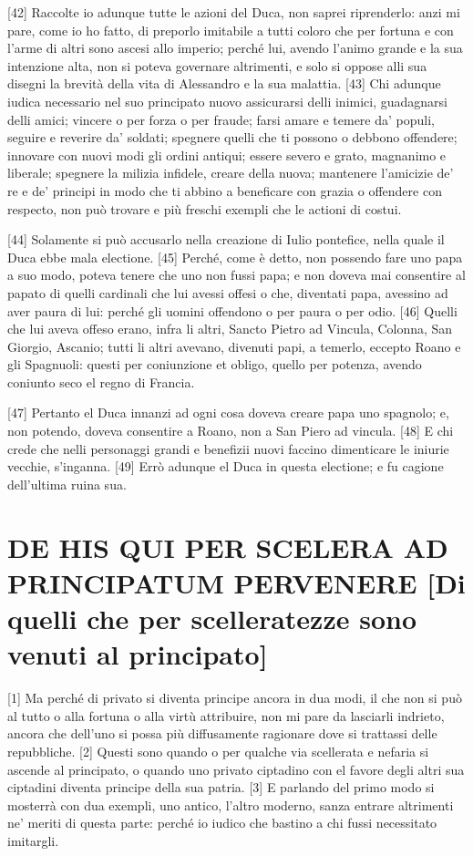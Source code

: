 {[}42{]} Raccolte io adunque tutte le azioni del Duca, non saprei
riprenderlo: anzi mi pare, come io ho fatto, di preporlo imitabile a
tutti coloro che per fortuna e con l'arme di altri sono ascesi allo
imperio; perché lui, avendo l'animo grande e la sua intenzione alta, non
si poteva governare altrimenti, e solo si oppose alli sua disegni la
brevità della vita di Alessandro e la sua malattia. {[}43{]} Chi adunque
iudica necessario nel suo principato nuovo assicurarsi delli inimici,
guadagnarsi delli amici; vincere o per forza o per fraude; farsi amare e
temere da' populi, seguire e reverire da' soldati; spegnere quelli che
ti possono o debbono offendere; innovare con nuovi modi gli ordini
antiqui; essere severo e grato, magnanimo e liberale; spegnere la
milizia infidele, creare della nuova; mantenere l'amicizie de' re e de'
principi in modo che ti abbino a beneficare con grazia o offendere con
respecto, non può trovare e più freschi exempli che le actioni di
costui.

{[}44{]} Solamente si può accusarlo nella creazione di Iulio pontefice,
nella quale il Duca ebbe mala electione. {[}45{]} Perché, come è detto,
non possendo fare uno papa a suo modo, poteva tenere che uno non fussi
papa; e non doveva mai consentire al papato di quelli cardinali che lui
avessi offesi o che, diventati papa, avessino ad aver paura di lui:
perché gli uomini offendono o per paura o per odio. {[}46{]} Quelli che
lui aveva offeso erano, infra li altri, Sancto Pietro ad Vincula,
Colonna, San Giorgio, Ascanio; tutti li altri avevano, divenuti papi, a
temerlo, eccepto Roano e gli Spagnuoli: questi per coniunzione et
obligo, quello per potenza, avendo coniunto seco el regno di Francia.

{[}47{]} Pertanto el Duca innanzi ad ogni cosa doveva creare papa uno
spagnolo; e, non potendo, doveva consentire a Roano, non a San Piero ad
vincula. {[}48{]} E chi crede che nelli personaggi grandi e benefizii
nuovi faccino dimenticare le iniurie vecchie, s'inganna. {[}49{]} Errò
adunque el Duca in questa electione; e fu cagione dell'ultima ruina sua.

\quebra\section{DE HIS QUI PER SCELERA AD PRINCIPATUM PERVENERE
{[}Di quelli che per scelleratezze sono venuti al principato{]}}

{[}1{]} Ma perché di privato si diventa principe ancora in dua modi, il
che non si può al tutto o alla fortuna o alla virtù attribuire, non mi
pare da lasciarli indrieto, ancora che dell'uno si possa più
diffusamente ragionare dove si trattassi delle repubbliche. {[}2{]}
Questi sono quando o per qualche via scellerata e nefaria si ascende al
principato, o quando uno privato ciptadino con el favore degli altri sua
ciptadini diventa principe della sua patria. {[}3{]} E parlando del
primo modo si mosterrà con dua exempli, uno antico, l'altro moderno,
sanza entrare altrimenti ne' meriti di questa parte: perché io iudico
che bastino a chi fussi necessitato imitargli.

